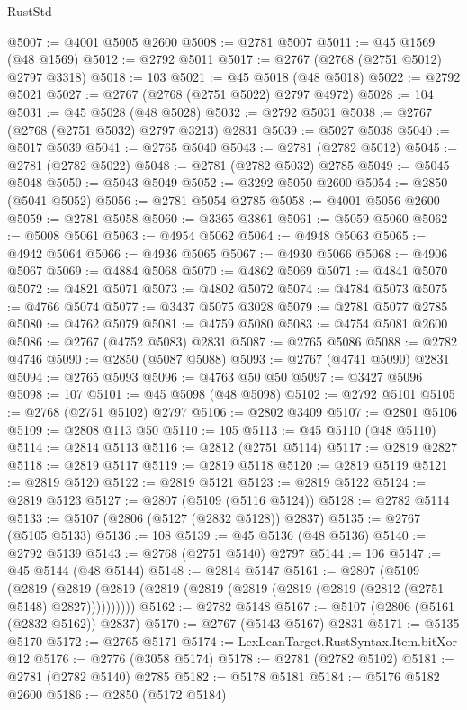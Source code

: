 \begin{lexlean}{RustStd}
\begin{coremodule}
@5007 := @4001 @5005 @2600
@5008 := @2781 @5007
@5011 := @45 @1569 (@48 @1569)
@5012 := @2792 @5011
@5017 := @2767 (@2768 (@2751 @5012) @2797 @3318)
@5018 := 103
@5021 := @45 @5018 (@48 @5018)
@5022 := @2792 @5021
@5027 := @2767 (@2768 (@2751 @5022) @2797 @4972)
@5028 := 104
@5031 := @45 @5028 (@48 @5028)
@5032 := @2792 @5031
@5038 := @2767 (@2768 (@2751 @5032) @2797 @3213) @2831
@5039 := @5027 @5038
@5040 := @5017 @5039
@5041 := @2765 @5040
@5043 := @2781 (@2782 @5012)
@5045 := @2781 (@2782 @5022)
@5048 := @2781 (@2782 @5032) @2785
@5049 := @5045 @5048
@5050 := @5043 @5049
@5052 := @3292 @5050 @2600
@5054 := @2850 (@5041 @5052)
@5056 := @2781 @5054 @2785
@5058 := @4001 @5056 @2600
@5059 := @2781 @5058
@5060 := @3365 @3861
@5061 := @5059 @5060
@5062 := @5008 @5061
@5063 := @4954 @5062
@5064 := @4948 @5063
@5065 := @4942 @5064
@5066 := @4936 @5065
@5067 := @4930 @5066
@5068 := @4906 @5067
@5069 := @4884 @5068
@5070 := @4862 @5069
@5071 := @4841 @5070
@5072 := @4821 @5071
@5073 := @4802 @5072
@5074 := @4784 @5073
@5075 := @4766 @5074
@5077 := @3437 @5075 @3028
@5079 := @2781 @5077 @2785
@5080 := @4762 @5079
@5081 := @4759 @5080
@5083 := @4754 @5081 @2600
@5086 := @2767 (@4752 @5083) @2831
@5087 := @2765 @5086
@5088 := @2782 @4746
@5090 := @2850 (@5087 @5088)
@5093 := @2767 (@4741 @5090) @2831
@5094 := @2765 @5093
@5096 := @4763 @50 @50
@5097 := @3427 @5096
@5098 := 107
@5101 := @45 @5098 (@48 @5098)
@5102 := @2792 @5101
@5105 := @2768 (@2751 @5102) @2797
@5106 := @2802 @3409
@5107 := @2801 @5106
@5109 := @2808 @113 @50
@5110 := 105
@5113 := @45 @5110 (@48 @5110)
@5114 := @2814 @5113
@5116 := @2812 (@2751 @5114)
@5117 := @2819 @2827
@5118 := @2819 @5117
@5119 := @2819 @5118
@5120 := @2819 @5119
@5121 := @2819 @5120
@5122 := @2819 @5121
@5123 := @2819 @5122
@5124 := @2819 @5123
@5127 := @2807 (@5109 (@5116 @5124))
@5128 := @2782 @5114
@5133 := @5107 (@2806 (@5127 (@2832 @5128)) @2837)
@5135 := @2767 (@5105 @5133)
@5136 := 108
@5139 := @45 @5136 (@48 @5136)
@5140 := @2792 @5139
@5143 := @2768 (@2751 @5140) @2797
@5144 := 106
@5147 := @45 @5144 (@48 @5144)
@5148 := @2814 @5147
@5161 := @2807
    (@5109
      (@2819 (@2819 (@2819 (@2819 (@2819 (@2819 (@2819 (@2819 (@2812 (@2751 @5148) @2827))))))))))
@5162 := @2782 @5148
@5167 := @5107 (@2806 (@5161 (@2832 @5162)) @2837)
@5170 := @2767 (@5143 @5167) @2831
@5171 := @5135 @5170
@5172 := @2765 @5171
@5174 := LexLeanTarget.RustSyntax.Item.bitXor @12
@5176 := @2776 (@3058 @5174)
@5178 := @2781 (@2782 @5102)
@5181 := @2781 (@2782 @5140) @2785
@5182 := @5178 @5181
@5184 := @5176 @5182 @2600
@5186 := @2850 (@5172 @5184)

\end{coremodule}
\end{lexlean}
